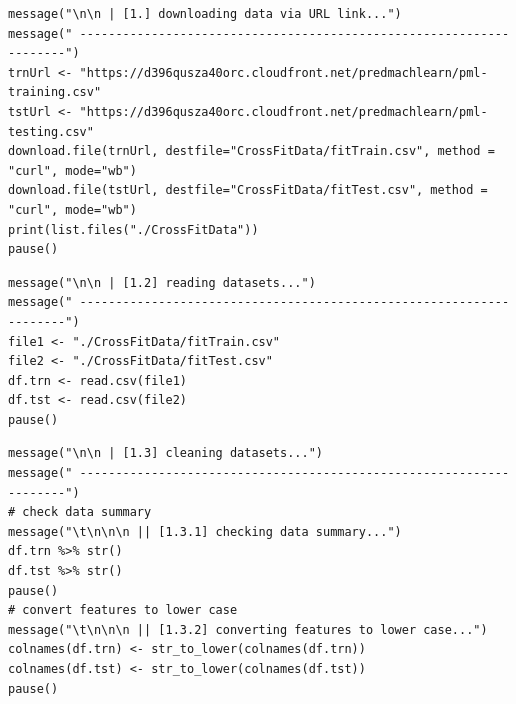 \documentclass[10pt, twoside]{article}
\begin{document}
\begin{verbatim}
message("\n\n | [1.] downloading data via URL link...")
message(" --------------------------------------------------------------------")
trnUrl <- "https://d396qusza40orc.cloudfront.net/predmachlearn/pml-training.csv"
tstUrl <- "https://d396qusza40orc.cloudfront.net/predmachlearn/pml-testing.csv"
download.file(trnUrl, destfile="CrossFitData/fitTrain.csv", method = "curl", mode="wb")
download.file(tstUrl, destfile="CrossFitData/fitTest.csv", method = "curl", mode="wb")
print(list.files("./CrossFitData"))
pause()
\end{verbatim}

\begin{verbatim}
message("\n\n | [1.2] reading datasets...")
message(" --------------------------------------------------------------------")
file1 <- "./CrossFitData/fitTrain.csv"
file2 <- "./CrossFitData/fitTest.csv"
df.trn <- read.csv(file1)
df.tst <- read.csv(file2)
pause()
\end{verbatim}

\begin{verbatim}
message("\n\n | [1.3] cleaning datasets...")
message(" --------------------------------------------------------------------")
# check data summary
message("\t\n\n\n || [1.3.1] checking data summary...")
df.trn %>% str()
df.tst %>% str()
pause()
# convert features to lower case
message("\t\n\n\n || [1.3.2] converting features to lower case...")
colnames(df.trn) <- str_to_lower(colnames(df.trn))
colnames(df.tst) <- str_to_lower(colnames(df.tst))
pause()
\end{verbatim}
\end{document}
